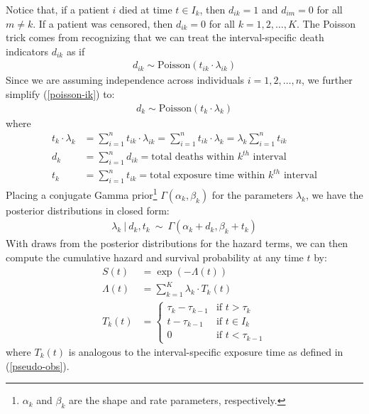\documentclass{article}
\begin{document}
Notice that, if a patient $i$ died at time $t \in I_k$, then $d_{ik}=1$ and $d_{im}=0$ for all $m\neq k$. If a patient 
was censored, then $d_{ik}=0$ for all $k=1,2,\dots, K$. The Poisson trick comes from recognizing that we can treat 
the interval-specific death indicators $d_{ik}$ as if
\begin{align}
    d_{ik} \sim \textrm{Poisson}(t_{ik}\cdot \lambda_{ik}) \label{poisson-ik}
\end{align}
Since we are assuming independence across individuals $i=1,2,\dots, n$, we further simplify (\ref*{poisson-ik}) to:
\begin{align}
    d_k \sim \textrm{Poisson}(t_{k}\cdot \lambda_{k}) \label{poisson-k}
\end{align}
where
\begin{align*}
    t_k\cdot \lambda_k &= \sum_{i=1}^n t_{ik} \cdot \lambda_{ik} = \sum_{i=1}^n t_{ik} \cdot \lambda_{k} = \lambda_{k} \sum_{i=1}^n t_{ik} \\
    d_k &= \sum_{i=1}^n d_{ik} = \textrm{total deaths within $k^{th}$ interval} \\
    t_k &= \sum_{i=1}^n t_{ik} = \textrm{total exposure time within $k^{th}$ interval} 
\end{align*}
Placing a conjugate Gamma prior\footnote{$\alpha_k$ and $\beta_k$ are the shape and rate parameters, respectively.} $\Gamma(\alpha_k, \beta_k)$ for the parameters $\lambda_k$, we have the posterior distributions in closed form:
\begin{align}
    \lambda_k \ |\ d_k,t_k \ \sim \ \Gamma\left(\alpha_k + d_k, \beta_k + t_k\right) \label{post-hazards}
\end{align}
With draws from the posterior distributions for the hazard terms, we can then compute the cumulative hazard and survival probability at any time $t$ by:
\begin{align}
    S(t) &= \exp(-\Lambda(t)) \nonumber\\
    \Lambda(t) &= \sum_{k=1}^{K}\lambda_k \cdot T_k(t) \label{surv}\\
    T_k(t) &= \begin{cases}
        \tau_k - \tau_{k-1} &\textrm{if $t>\tau_k$}\\
        t - \tau_{k-1} &\textrm{if $t \in I_k$}\\
        0&\textrm{if $t < \tau_{k-1}$}\nonumber
    \end{cases}
\end{align}
where $T_k(t)$ is analogous to the interval-specific exposure time as defined in (\ref*{pseudo-obs}). 
\end{document}
